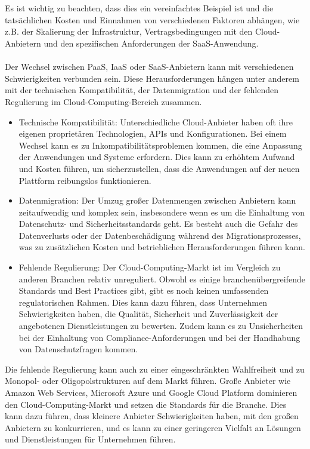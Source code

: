 \\\\
Es ist wichtig zu beachten, dass dies ein vereinfachtes Beispiel ist und die tatsächlichen Kosten und Einnahmen von verschiedenen Faktoren abhängen, wie z.B. der Skalierung der Infrastruktur, Vertragsbedingungen mit den Cloud-Anbietern und den spezifischen Anforderungen der SaaS-Anwendung.
\\\\
Der Wechsel zwischen PaaS, IaaS oder SaaS-Anbietern kann mit verschiedenen Schwierigkeiten verbunden sein. Diese Herausforderungen hängen unter anderem mit der technischen Kompatibilität, der Datenmigration und der fehlenden Regulierung im Cloud-Computing-Bereich zusammen.
\begin{itemize}
\item Technische Kompatibilität: Unterschiedliche Cloud-Anbieter haben oft ihre eigenen proprietären Technologien, APIs und Konfigurationen. Bei einem Wechsel kann es zu Inkompatibilitätsproblemen kommen, die eine Anpassung der Anwendungen und Systeme erfordern. Dies kann zu erhöhtem Aufwand und Kosten führen, um sicherzustellen, dass die Anwendungen auf der neuen Plattform reibungslos funktionieren.

\item Datenmigration: Der Umzug großer Datenmengen zwischen Anbietern kann zeitaufwendig und komplex sein, insbesondere wenn es um die Einhaltung von Datenschutz- und Sicherheitsstandards geht. Es besteht auch die Gefahr des Datenverlusts oder der Datenbeschädigung während des Migrationsprozesses, was zu zusätzlichen Kosten und betrieblichen Herausforderungen führen kann.

\item Fehlende Regulierung: Der Cloud-Computing-Markt ist im Vergleich zu anderen Branchen relativ unreguliert. Obwohl es einige branchenübergreifende Standards und Best Practices gibt, gibt es noch keinen umfassenden regulatorischen Rahmen. Dies kann dazu führen, dass Unternehmen Schwierigkeiten haben, die Qualität, Sicherheit und Zuverlässigkeit der angebotenen Dienstleistungen zu bewerten. Zudem kann es zu Unsicherheiten bei der Einhaltung von Compliance-Anforderungen und bei der Handhabung von Datenschutzfragen kommen.
\end{itemize}
Die fehlende Regulierung kann auch zu einer eingeschränkten Wahlfreiheit und zu Monopol- oder Oligopolstrukturen auf dem Markt führen. Große Anbieter wie Amazon Web Services, Microsoft Azure und Google Cloud Platform dominieren den Cloud-Computing-Markt und setzen die Standards für die Branche. Dies kann dazu führen, dass kleinere Anbieter Schwierigkeiten haben, mit den großen Anbietern zu konkurrieren, und es kann zu einer geringeren Vielfalt an Lösungen und Dienstleistungen für Unternehmen führen.
